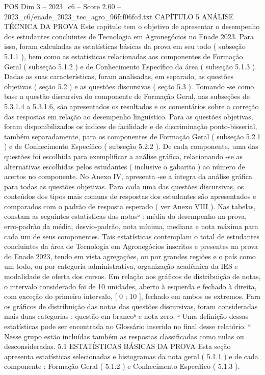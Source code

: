 \begin{textsample}{POS Dim 3 – 2023\_c6 – Score 2.00 – 2023\_c6/enade\_2023\_tec\_agro\_96fcf06fcd.txt}  \label{ex:f3_pos_108}
CAPÍTULO 5 ANÁLISE TÉCNICA DA PROVA Este capítulo tem o objetivo de apresentar o desempenho dos estudantes concluintes de Tecnologia em Agronegócios no Enade 2023.
Para isso, foram calculadas as estatísticas básicas da prova em seu todo ( subseção 5.1.1 ), bem como as estatísticas relacionadas aos componentes de Formação Geral ( subseção 5.1.2 ) e de Conhecimento Específico da área ( subseção 5.1.3 ).
Dadas as suas características, foram analisadas, em separado, as questões objetivas ( seção 5.2 ) e as questões discursivas ( seção 5.3 ).
Tomando -se como base a questão discursiva do componente de Formação Geral, nas subseções de 5.3.1.4 a 5.3.1.6, são apresentados os resultados e os comentários sobre a correção das respostas em relação ao desempenho linguístico.
Para as questões objetivas, foram disponibilizados os índices de facilidade e de discriminação ponto-bisserial, também separadamente, para os componentes de Formação Geral ( subseção 5.2.1 ) e de Conhecimento Específico ( subseção 5.2.2 ).
De cada componente, uma das questões foi escolhida para exemplificar a análise gráfica, relacionando -se as alternativas escolhidas pelos estudantes ( inclusive o gabarito ) ao número de acertos no componente.
No Anexo IV, apresenta -se a íntegra da análise gráfica para todas as questões objetivas.
Para cada uma das questões discursivas, os conteúdos dos tipos mais comuns de respostas dos estudantes são apresentados e comparados com o padrão de resposta esperado ( ver Anexo VIII ).
Nas tabelas, constam as seguintes estatísticas das notas⁵ : média do desempenho na prova, erro-padrão da média, desvio-padrão, nota mínima, mediana e nota máxima para cada um de seus componentes.
Tais estatísticas contemplam o total de estudantes concluintes da área de Tecnologia em Agronegócios inscritos e presentes na prova do Enade 2023, tendo em vista agregações, ou por grandes regiões e o país como um todo, ou por categoria administrativa, organização acadêmica da IES e modalidade de oferta dos cursos.
Em relação aos gráficos de distribuição de notas, o intervalo considerado foi de 10 unidades, aberto à esquerda e fechado à direita, com exceção do primeiro intervalo, [ 0 ; 10 ], fechado em ambos os extremos.
Para os gráficos de distribuição das notas das questões discursivas, foram consideradas mais duas categorias : questão em branco⁶ e nota zero. ⁵ Uma definição dessas estatísticas pode ser encontrada no Glossário inserido no final desse relatório. ⁶ Nesse grupo estão incluídas também as respostas classificadas como nulas ou desconsideradas. 5.1 ESTATÍSTICAS BÁSICAS DA PROVA Esta seção apresenta estatísticas selecionadas e histogramas da nota geral ( 5.1.1 ) e de cada componente : Formação Geral ( 5.1.2 ) e Conhecimento Específico ( 5.1.3 ).

\end{textsample}
